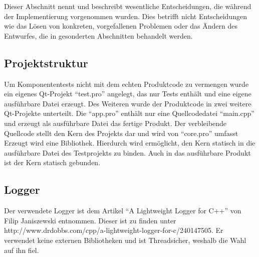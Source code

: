 Dieser Abschnitt nennt und beschreibt wesentliche Entscheidungen, die während der Implementierung vorgenommen wurden. Dies betrifft nicht Entscheidungen wie das Lösen von konkreten, vorgefallenen Problemen oder das Ändern des Entwurfes, die in gesonderten Abschnitten behandelt werden.

\subsection{Projektstruktur}
Um Komponententests nicht mit dem echten Produktcode zu vermengen wurde ein eigenes Qt-Projekt \enquote{test.pro}
angelegt, das nur Tests enthält und eine eigene ausführbare Datei erzeugt. Des Weiteren wurde der Produktcode in zwei weitere Qt-Projekte unterteilt. Die \enquote{app.pro} enthält nur eine Quellcodedatei \enquote{main.cpp} und erzeugt als ausführbare Datei das fertige Produkt. Der verbleibende Quellcode stellt den Kern des Projekts dar und wird von \enquote{core.pro} umfasst Erzeugt wird eine Bibliothek. Hierdurch wird ermöglicht, den Kern statisch in die ausführbare Datei des Testprojekts zu binden. Auch in das ausführbare Produkt ist der Kern statisch gebunden.

\subsection{Logger}
Der verwendete Logger ist dem Artikel \enquote{A Lightweight Logger for C++} von Filip Janiszewski entnommen.
Dieser ist zu finden unter http://www.drdobbs.com/cpp/a-lightweight-logger-for-c/240147505.
Er verwendet keine externen Bibliotheken und ist Threadsicher, weshalb die Wahl auf ihn fiel.
